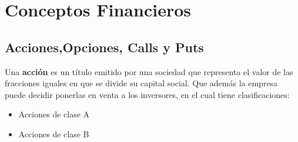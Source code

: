 \chapter{Conceptos Financieros }
\section{Acciones,Opciones, Calls y Puts}
Una \textbf{acción} es un título emitido por una sociedad que representa el valor de las fracciones iguales en que se divide su capital social. Que además la empresa puede decidir ponerlas en venta a los inversores, en el cual tiene clasificaciones:
	\begin{itemize}
		\item Acciones de clase A 
		\item Acciones de clase B
	 
	\end{itemize}
 	
